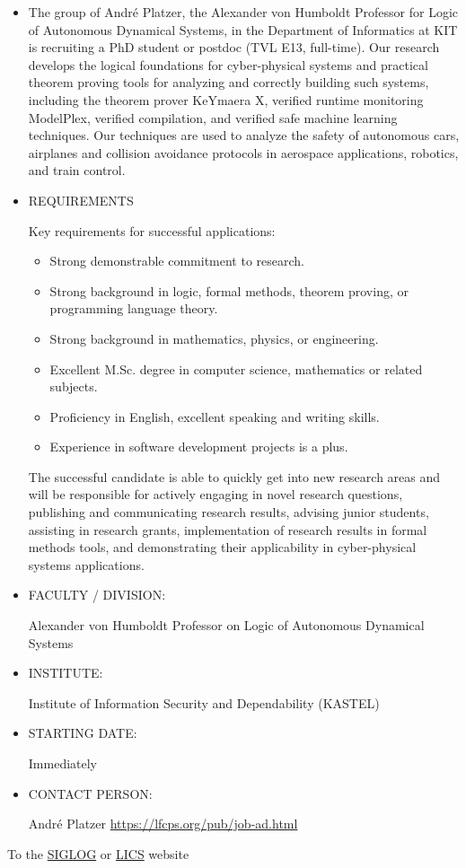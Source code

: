 \documentclass[prodmode,acmtecs]{acmsmall} %
\begin{document}
\begin{itemize}\item  The group of André Platzer, the Alexander von Humboldt Professor for Logic of Autonomous Dynamical Systems, in the Department of Informatics at KIT is recruiting a PhD student or postdoc (TVL E13, full-time). Our research develops the logical foundations for cyber-physical systems and practical theorem proving tools for analyzing and correctly building such systems, including the theorem prover KeYmaera X, verified runtime monitoring ModelPlex, verified compilation, and verified safe machine learning techniques. Our techniques are used to analyze the safety of autonomous cars, airplanes and collision avoidance protocols in aerospace applications, robotics, and train control. 
 
\item  REQUIREMENTS 
 
  Key requirements for successful applications: 
 
\begin{itemize}\item  Strong demonstrable commitment to research.
\item  Strong background in logic, formal methods, theorem proving, or programming language theory.
\item  Strong background in mathematics, physics, or engineering.
\item  Excellent M.Sc. degree in computer science, mathematics or related subjects.
\item  Proficiency in English, excellent speaking and writing skills.
\item  Experience in software development projects is a plus.
\end{itemize} 
  The successful candidate is able to quickly get into new research areas and will be responsible for actively engaging in novel research questions, publishing and communicating research results, advising junior students, assisting in research grants, implementation of research results in formal methods tools, and demonstrating their applicability in cyber-physical systems applications. 
 
\item  FACULTY / DIVISION: 
 
  Alexander von Humboldt Professor on Logic of Autonomous Dynamical Systems 
 
\item  INSTITUTE: 
 
  Institute of Information Security and Dependability (KASTEL) 
 
\item  STARTING DATE:  
 
  Immediately 
 
\item  CONTACT PERSON:  
 
  André Platzer \href{https://lfcps.org/pub/job-ad.html}{https://lfcps.org/pub/job-ad.html} 
 
\end{itemize}


To the \href{http://siglog.org/}{SIGLOG} or \href{https://lics.siglog.org}{LICS} website
\end{document}
